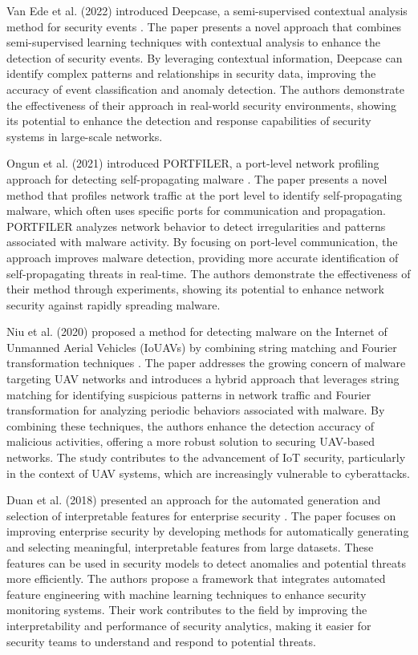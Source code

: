 Van Ede et al. (2022) introduced Deepcase, a semi-supervised contextual analysis method for security events \cite{van2022deepcase}. The paper presents a novel approach that combines semi-supervised learning techniques with contextual analysis to enhance the detection of security events. By leveraging contextual information, Deepcase can identify complex patterns and relationships in security data, improving the accuracy of event classification and anomaly detection. The authors demonstrate the effectiveness of their approach in real-world security environments, showing its potential to enhance the detection and response capabilities of security systems in large-scale networks.

Ongun et al. (2021) introduced PORTFILER, a port-level network profiling approach for detecting self-propagating malware \cite{ongun2021portfiler}. The paper presents a novel method that profiles network traffic at the port level to identify self-propagating malware, which often uses specific ports for communication and propagation. PORTFILER analyzes network behavior to detect irregularities and patterns associated with malware activity. By focusing on port-level communication, the approach improves malware detection, providing more accurate identification of self-propagating threats in real-time. The authors demonstrate the effectiveness of their method through experiments, showing its potential to enhance network security against rapidly spreading malware.

Niu et al. (2020) proposed a method for detecting malware on the Internet of Unmanned Aerial Vehicles (IoUAVs) by combining string matching and Fourier transformation techniques \cite{niu2020malware}. The paper addresses the growing concern of malware targeting UAV networks and introduces a hybrid approach that leverages string matching for identifying suspicious patterns in network traffic and Fourier transformation for analyzing periodic behaviors associated with malware. By combining these techniques, the authors enhance the detection accuracy of malicious activities, offering a more robust solution to securing UAV-based networks. The study contributes to the advancement of IoT security, particularly in the context of UAV systems, which are increasingly vulnerable to cyberattacks.

Duan et al. (2018) presented an approach for the automated generation and selection of interpretable features for enterprise security \cite{duan2018automated}. The paper focuses on improving enterprise security by developing methods for automatically generating and selecting meaningful, interpretable features from large datasets. These features can be used in security models to detect anomalies and potential threats more efficiently. The authors propose a framework that integrates automated feature engineering with machine learning techniques to enhance security monitoring systems. Their work contributes to the field by improving the interpretability and performance of security analytics, making it easier for security teams to understand and respond to potential threats.


